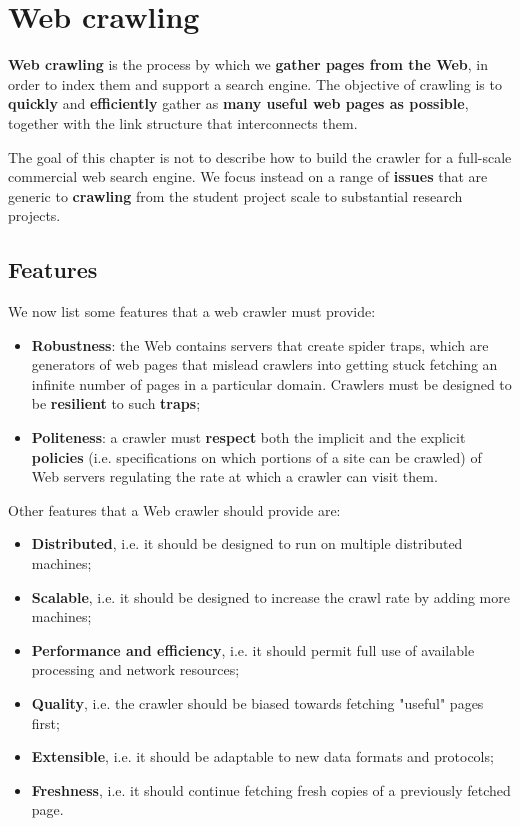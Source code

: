 \section{Web crawling}
\textbf{Web crawling} is the process by which we \textbf{gather pages from the Web}, in order to index them and support a search engine. The objective of crawling is to \textbf{quickly} and \textbf{efficiently} gather as \textbf{many useful web pages as possible}, together with the link structure that interconnects them. 

The goal of this chapter is not to describe how to build the crawler for a full-scale commercial web search engine. We focus instead on a range of \textbf{issues} that are generic to \textbf{crawling} from the student project scale to substantial research projects. 

\subsection{Features}
We now list some features that a web crawler must provide:

\begin{itemize}
    \item \textbf{Robustness}: the Web contains servers that create spider traps, which are generators of web pages that mislead crawlers into getting stuck fetching an infinite number of pages in a particular domain. Crawlers must be designed to be \textbf{resilient} to such \textbf{traps};
    \item \textbf{Politeness}: a crawler must \textbf{respect} both the implicit and the explicit \textbf{policies} (i.e. specifications on which portions of a site can be crawled) of Web servers regulating the rate at which a crawler can visit them. 
\end{itemize}

Other features that a Web crawler should provide are:

\begin{itemize}
    \item \textbf{Distributed}, i.e. it should be designed to run on multiple distributed machines;
    \item \textbf{Scalable}, i.e. it should be designed to increase the crawl rate by adding more machines;
    \item \textbf{Performance and efficiency}, i.e. it should permit full use of available processing and network resources;
    \item \textbf{Quality}, i.e. the crawler should be biased towards fetching "useful" pages first;
    \item \textbf{Extensible}, i.e. it should be adaptable to new data formats and protocols;
    \item \textbf{Freshness}, i.e. it should continue fetching fresh copies of a previously fetched page.
\end{itemize}

